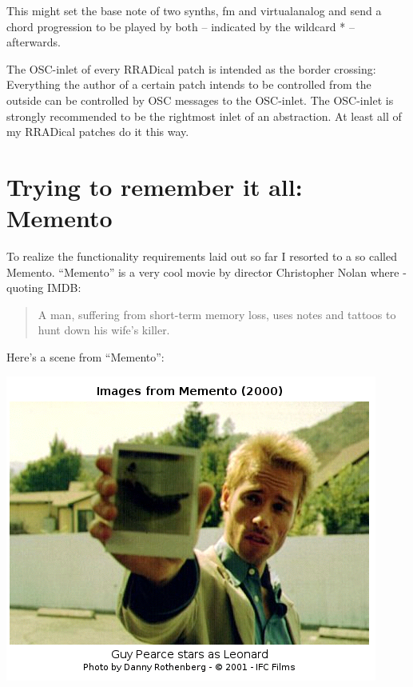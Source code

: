 \documentclass[10pt,english]{scrartcl}
\begin{document}
This might set the base note of two synths, fm and virtualanalog and
send a chord progression to be played by both -- indicated by the wildcard
* -- afterwards.

The OSC-inlet of every RRADical patch is intended as the border crossing:
Everything the author of a certain patch intends to be controlled from the
outside can be controlled by OSC messages to the OSC-inlet. The OSC-inlet is
strongly recommended to be the rightmost inlet of an abstraction. At least
all of my RRADical patches do it this way.



\hypertarget{trying-to-remember-it-all-memento}{}
\section*{Trying to remember it all: Memento}

To realize the functionality requirements laid out so far I resorted to a so
called Memento. ``Memento'' is a very cool movie by director Christopher
Nolan where - quoting IMDB:
\begin{quote}

A man, suffering from short-term memory loss, uses notes and tattoos to
hunt down his wife's killer.
\end{quote}

Here's a scene from ``Memento'':

\includegraphics{memento.png}
\end{document}

